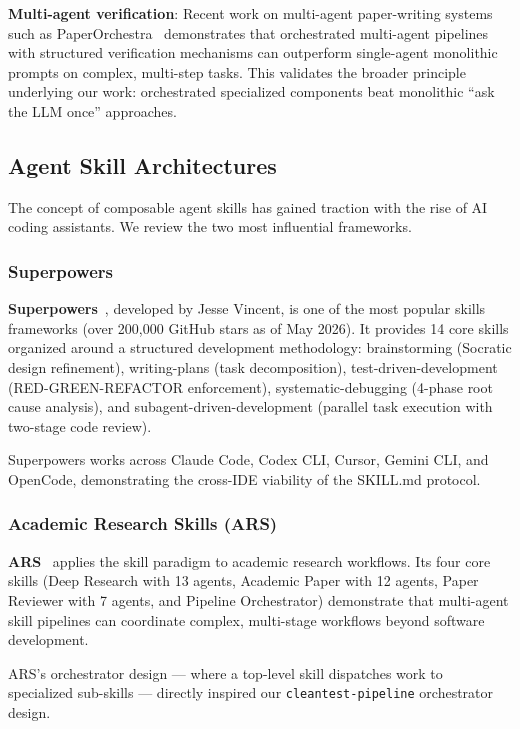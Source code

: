 \documentclass[acmlarge,nonacm,screen]{acmart}
\begin{document}
\textbf{Multi-agent verification}: Recent work on multi-agent paper-writing systems such as PaperOrchestra~\cite{song2026paperorchestra} demonstrates that orchestrated multi-agent pipelines with structured verification mechanisms can outperform single-agent monolithic prompts on complex, multi-step tasks. This validates the broader principle underlying our work: orchestrated specialized components beat monolithic ``ask the LLM once'' approaches.

\subsection{Agent Skill Architectures}

The concept of composable agent skills has gained traction with the rise of AI coding assistants. We review the two most influential frameworks.

\subsubsection{Superpowers}

\textbf{Superpowers}~\cite{vincent2026superpowers}, developed by Jesse Vincent, is one of the most popular skills frameworks (over 200{,}000 GitHub stars as of May 2026). It provides 14 core skills organized around a structured development methodology: brainstorming (Socratic design refinement), writing-plans (task decomposition), test-driven-development (RED-GREEN-REFACTOR enforcement), systematic-debugging (4-phase root cause analysis), and subagent-driven-development (parallel task execution with two-stage code review).

Superpowers works across Claude Code, Codex CLI, Cursor, Gemini CLI, and OpenCode, demonstrating the cross-IDE viability of the SKILL.md protocol.

\subsubsection{Academic Research Skills (ARS)}

\textbf{ARS}~\cite{wu2026ars} applies the skill paradigm to academic research workflows. Its four core skills (Deep Research with 13 agents, Academic Paper with 12 agents, Paper Reviewer with 7 agents, and Pipeline Orchestrator) demonstrate that multi-agent skill pipelines can coordinate complex, multi-stage workflows beyond software development.

ARS's orchestrator design --- where a top-level skill dispatches work to specialized sub-skills --- directly inspired our \texttt{cleantest-pipeline} orchestrator design.
\end{document}
